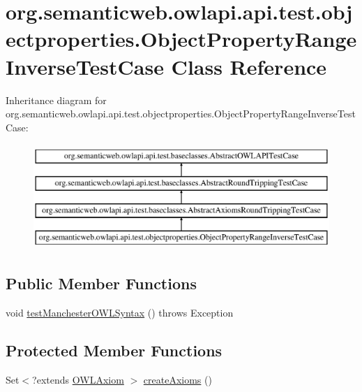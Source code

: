 \hypertarget{classorg_1_1semanticweb_1_1owlapi_1_1api_1_1test_1_1objectproperties_1_1_object_property_range_inverse_test_case}{\section{org.\-semanticweb.\-owlapi.\-api.\-test.\-objectproperties.\-Object\-Property\-Range\-Inverse\-Test\-Case Class Reference}
\label{classorg_1_1semanticweb_1_1owlapi_1_1api_1_1test_1_1objectproperties_1_1_object_property_range_inverse_test_case}
}
Inheritance diagram for org.\-semanticweb.\-owlapi.\-api.\-test.\-objectproperties.\-Object\-Property\-Range\-Inverse\-Test\-Case\-:\begin{figure}[H]
\begin{center}
\leavevmode
\includegraphics[height=4.000000cm]{classorg_1_1semanticweb_1_1owlapi_1_1api_1_1test_1_1objectproperties_1_1_object_property_range_inverse_test_case}
\end{center}
\end{figure}
\subsection*{Public Member Functions}
\begin{DoxyCompactItemize}
\item 
void \hyperlink{classorg_1_1semanticweb_1_1owlapi_1_1api_1_1test_1_1objectproperties_1_1_object_property_range_inverse_test_case_a6c3a1ba5ae205d756c761ed9ae0fc5fa}{test\-Manchester\-O\-W\-L\-Syntax} ()  throws Exception 
\end{DoxyCompactItemize}
\subsection*{Protected Member Functions}
\begin{DoxyCompactItemize}
\item 
Set$<$?extends \hyperlink{interfaceorg_1_1semanticweb_1_1owlapi_1_1model_1_1_o_w_l_axiom}{O\-W\-L\-Axiom} $>$ \hyperlink{classorg_1_1semanticweb_1_1owlapi_1_1api_1_1test_1_1objectproperties_1_1_object_property_range_inverse_test_case_a9bd69dd9e68b5b098b8b3630913e91e9}{create\-Axioms} ()
\end{DoxyCompactItemize}


